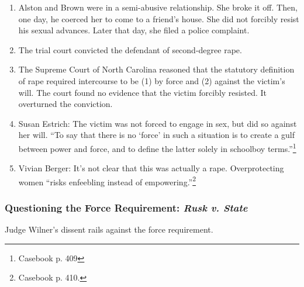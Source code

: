 \begin{enumerate}
    \item Alston and Brown were in a semi-abusive relationship. She broke it 
    off. Then, one day, he coerced her to come to a friend's house. She did 
    not forcibly resist his sexual advances. Later that day, she filed a 
    police complaint.
    \item The trial court convicted the defendant of second-degree rape.
    \item The Supreme Court of North Carolina reasoned that the statutory 
    definition of rape required intercourse to be (1) by force and (2) against 
    the victim's will. The court found no evidence that the victim forcibly 
    resisted. It overturned the conviction.
    \item Susan Estrich: The victim was not forced to engage in sex, but did 
    so against her will. ``To say that there is no `force' in such a situation 
    is to create a gulf between power and force, and to define the latter 
    solely in schoolboy terms.''\footnote{Casebook p. 409}
    \item Vivian Berger: It's not clear that this was actually a rape. 
    Overprotecting women ``risks enfeebling instead of 
    empowering.''\footnote{Casebook p. 410.}
\end{enumerate}

\subsubsection{Questioning the Force Requirement: \emph{Rusk v. State}}

Judge Wilner's dissent rails against the force requirement.

